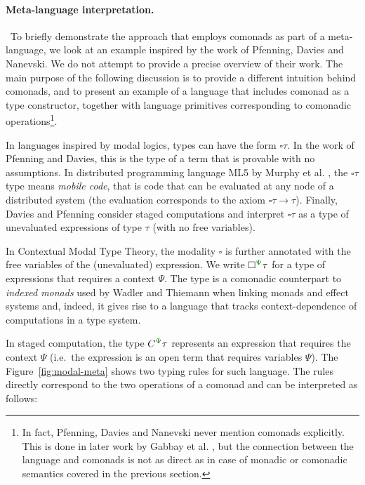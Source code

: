 
\paragraph{Meta-language interpretation.} ~To briefly demonstrate the app\-roach that employs comonads
as part of a meta-language, we look at an example inspired by the work of Pfenning, Davies and 
Nanevski. We do not attempt to provide a precise overview of their work. The main purpose 
of the following discussion is to provide a different intuition behind comonads, and to present an 
example of a language that includes comonad as a type constructor, together with language primitives
corresponding to comonadic operations\footnote{In fact, Pfenning, Davies and Nanevski 
\cite{logic-modal-reconstruction,logic-cmtt} never mention comonads explicitly. This is done in later 
work by Gabbay et al. \cite{logic-cmtt-semantics},  but the connection between the language and comonads
is not as direct as in case of monadic or comonadic semantics covered in the previous section.}. 

In languages inspired by modal logics, types can have the form $\square \tau$. In the work of
Pfenning and Davies, this is the type of a term that is provable with no assumptions. In distributed 
programming language ML5 by Murphy et al. \cite{app-distributed-ml5,logic-distributed-calculus}, the 
$\square \tau$ type means \emph{mobile code}, that is code that can be evaluated at any node of a 
distributed system (the evaluation corresponds to the axiom $\square \tau \rightarrow \tau$). 
Finally, Davies and Pfenning \cite{logic-modal-staged} consider staged computations and interpret 
$\square \tau$ as a type of unevaluated expressions of type $\tau$ (with no free variables).

In Contextual Modal Type Theory, the modality $\square$ is further annotated with the free variables
of the (unevaluated) expression. We write $\square^{\cclrd{\Psi}} \tau$ for a type of expressions
that requires a context $\Psi$. The type is a comonadic counterpart to \emph{indexed monads} used by 
Wadler and Thiemann when linking monads and effect systems and, indeed, it gives rise to a language 
that tracks context-dependence of computations in a type system.

In staged computation, the type $\ctyp{\cclrd{\Psi}}{\tau}$ represents an expression 
that requires the context $\Psi$ (i.e.~the expression is an open term that requires variables $\Psi$).
The Figure~\ref{fig:modal-meta} shows two typing rules for such language. The rules directly
correspond to the two operations of a comonad and can be interpreted as follows:

